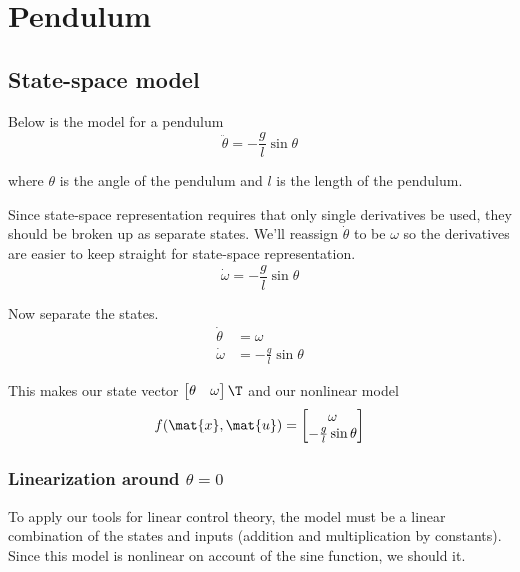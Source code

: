 \section{Pendulum}

\subsection{State-space model}

Below is the \gls{model} for a pendulum
\begin{equation*}
  \ddot{\theta} = -\frac{g}{l}\sin\theta
\end{equation*}

where $\theta$ is the angle of the pendulum and $l$ is the length of the
pendulum.

Since state-space representation requires that only single derivatives be used,
they should be broken up as separate \glspl{state}. We'll reassign
$\dot{\theta}$ to be $\omega$ so the derivatives are easier to keep straight for
state-space representation.
\begin{equation*}
  \dot{\omega} = -\frac{g}{l}\sin\theta
\end{equation*}

Now separate the \glspl{state}.
\begin{align*}
  \dot{\theta} &= \omega \\
  \dot{\omega} &= -\frac{g}{l} \sin\theta
\end{align*}

This makes our state vector $\begin{bmatrix}\theta & \omega\end{bmatrix}\T$ and
our nonlinear model
\begin{equation*}
  f(\mat{x}, \mat{u}) =
  \begin{bmatrix}
    \omega \\
    -\frac{g}{l}\sin\theta
  \end{bmatrix}
\end{equation*}

\subsubsection{Linearization around $\theta = 0$}

To apply our tools for linear control theory, the \gls{model} must be a linear
combination of the \glspl{state} and \glspl{input} (addition and multiplication
by constants). Since this \gls{model} is nonlinear on account of the sine
function, we should 
 it.

